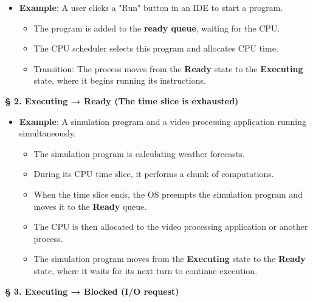\documentclass[a4paper]{book}
\newcommand{\sfbf}[1]{{\normalsize\textsf{\textbf{§ #1}}}}
\begin{document}
\begin{itemize}
\item 
\textbf{Example}: A user clicks a "Run" button in an IDE to start a program.
\begin{itemize}
\item 
The program is added to the \textbf{ready queue}, waiting for the CPU.

\item 
The CPU scheduler selects this program and allocates CPU time.

\item 
Transition: The process moves from the \textbf{Ready} state to the \textbf{Executing} state, where it begins running its instructions.

\end{itemize}

\end{itemize}

\hrulefill

\sfbf{2. Executing → Ready (The time slice is exhausted)}

\begin{itemize}
\item 
\textbf{Example}: A simulation program and a video processing application running simultaneously.
\begin{itemize}
\item 
The simulation program is calculating weather forecasts.

\item 
During its CPU time slice, it performs a chunk of computations.

\item 
When the time slice ends, the OS preempts the simulation program and moves it to the \textbf{Ready} queue.

\item 
The CPU is then allocated to the video processing application or another process.

\item
The simulation program moves from the \textbf{Executing} state to the \textbf{Ready} state, where it waits for its next turn to continue execution.
\end{itemize}

\end{itemize}

\hrulefill

\sfbf{3. Executing → Blocked (I/O request)}
\end{document}
